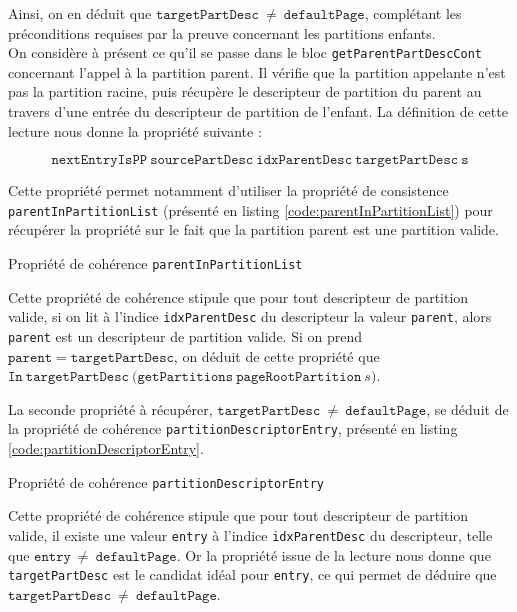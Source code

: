 			Ainsi, on en déduit que $\mathtt{targetPartDesc}~\neq~\mathtt{defaultPage}$, complétant les préconditions requises par la preuve concernant les partitions enfants.\\

			On considère à présent ce qu'il se passe dans le bloc \texttt{getParentPartDescCont} concernant l'appel à la partition parent. Il vérifie que la partition appelante n'est pas la partition racine, puis récupère le descripteur de partition du parent au travers d'une entrée du descripteur de partition de l'enfant. La définition de cette lecture nous donne la propriété suivante :

			$$\mathtt{nextEntryIsPP~sourcePartDesc~idxParentDesc~targetPartDesc~s}$$

			Cette propriété permet notamment d'utiliser la propriété de consistence \texttt{parentInPartitionList} (présenté en listing \ref{code:parentInPartitionList}) pour récupérer la propriété sur le fait que la partition parent est une partition valide. 

			\begin{listing}[!ht]
				\caption{Propriété de cohérence \texttt{parentInPartitionList}}
				\label{code:parentInPartitionList}
			\end{listing}

			Cette propriété de cohérence stipule que pour tout descripteur de partition valide, si on lit à l'indice \texttt{idxParentDesc} du descripteur la valeur \texttt{parent}, alors \texttt{parent} est un descripteur de partition valide. Si on prend $\mathtt{parent} = \mathtt{targetPartDesc}$, on déduit de cette propriété que $\mathtt{In~targetPartDesc~(getPartitions~pageRootPartition}~s\mathtt{)}$.

			La seconde propriété à récupérer, $\mathtt{targetPartDesc}~\neq~\mathtt{defaultPage}$, se déduit de la propriété de cohérence \texttt{partitionDescriptorEntry}, présenté en listing \ref{code:partitionDescriptorEntry}.
			\begin{listing}[!ht]
				\caption{Propriété de cohérence \texttt{partitionDescriptorEntry}}
				\label{code:partitionDescriptorEntry}
			\end{listing}

			Cette propriété de cohérence stipule que pour tout descripteur de partition valide, il existe une valeur \texttt{entry} à l'indice \texttt{idxParentDesc} du descripteur, telle que $\mathtt{entry}~\neq~\mathtt{defaultPage}$. Or la propriété issue de la lecture nous donne que \texttt{targetPartDesc} est le candidat idéal pour \texttt{entry}, ce qui permet de déduire que $\mathtt{targetPartDesc}~\neq~\mathtt{defaultPage}$.

